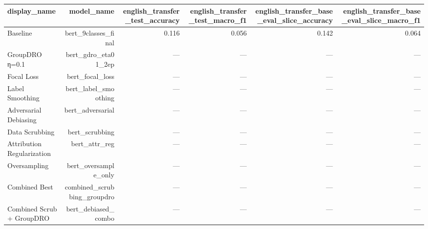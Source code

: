 \begin{tabular}{lrrrrr}
\toprule
\textbf{display\_name} & \textbf{model\_name} & \textbf{english\_transfer\_test\_accuracy} & \textbf{english\_transfer\_test\_macro\_f1} & \textbf{english\_transfer\_base\_eval\_slice\_accuracy} & \textbf{english\_transfer\_base\_eval\_slice\_macro\_f1} \\
\midrule
Baseline & bert\_9classes\_final & 0.116 & 0.056 & 0.142 & 0.064 \\
GroupDRO η=0.1 & bert\_gdro\_eta01\_2ep & --- & --- & --- & --- \\
Focal Loss & bert\_focal\_loss & --- & --- & --- & --- \\
Label Smoothing & bert\_label\_smoothing & --- & --- & --- & --- \\
Adversarial Debiasing & bert\_adversarial & --- & --- & --- & --- \\
Data Scrubbing & bert\_scrubbing & --- & --- & --- & --- \\
Attribution Regularization & bert\_attr\_reg & --- & --- & --- & --- \\
Oversampling & bert\_oversample\_only & --- & --- & --- & --- \\
Combined Best & combined\_scrubbing\_groupdro & --- & --- & --- & --- \\
Combined Scrub + GroupDRO & bert\_debiased\_combo & --- & --- & --- & --- \\
\bottomrule
\end{tabular}
